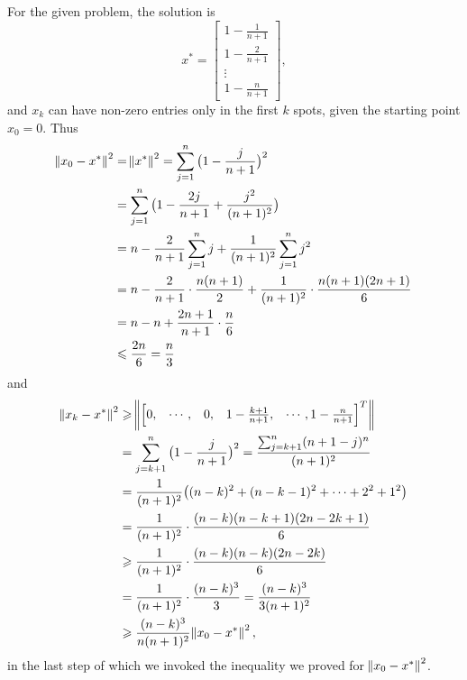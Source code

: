 \documentclass[11pt]{article}
\begin{document}
\section{}
For the given problem, the solution is 
$$x^* = \begin{bmatrix}1-\frac1{n+1} \\ 1-\frac2{n+1} \\ \vdots \\ 1-\frac n{n+1}\end{bmatrix},$$
and $x_k$ can have non-zero entries only in the first $k$ spots, given the starting point $x_0 = 0$.
Thus
\begin{equation}\begin{split} 
\norm{x_0-x^*}^2 &= \norm{x^*}^2 = \sum_{j=1}^n\big(1 - \frac j{n+1} \big)^2 \\ 
&= \sum_{j=1}^n \big( 1 - \frac{2j}{n+1} + \frac{j^2}{(n+1)^2} \big) \\
&= n - \frac2{n+1}\sum_{j=1}^n j + \frac1{(n+1)^2}\sum_{j=1}^n j^2 \\
&= n - \frac2{n+1}\cdot \frac{n(n+1)}2 + \frac1{(n+1)^2}\cdot \frac{n(n+1)(2n+1)}6 \\
&= n - n + \frac{2n+1}{n+1}\cdot\frac{n}6 \\
&\leqslant \frac{2n}6 = \frac{n}3
\end{split}\nonumber\end{equation}  
and
\begin{equation}\begin{split} 
\norm{x_k-x^*}^2 &\geqslant \norm{\begin{bmatrix}0, & \cdots, & 0, & 1 - \frac{k+1}{n+1}, & \cdots, 1-\frac n{n+1} \end{bmatrix}^T } \\
&= \sum_{j=k+1}^n \big(1-\frac j{n+1} \big)^2 = \frac{\sum_{j=k+1}^n(n+1-j)^n}{(n+1)^2} \\
&= \frac1{(n+1)^2}\big((n-k)^2+(n-k-1)^2 + \cdots + 2^2 +1^2 \big)\\
&= \frac1{(n+1)^2}\cdot \frac{(n-k)(n-k+1)(2n-2k+1)}6 \\
&\geqslant \frac1{(n+1)^2}\cdot\frac{(n-k)(n-k)(2n-2k)}6 \\
&= \frac1{(n+1)^2}\cdot\frac{(n-k)^3}3 = \frac{(n-k)^3}{3(n+1)^2} \\
&\geqslant \frac{(n-k)^3}{n(n+1)^2}\norm{x_0-x^*}^2,
\end{split}\nonumber\end{equation}
in the last step of which we invoked the inequality we proved for $\norm{x_0-x^*}^2$.
\end{document}
